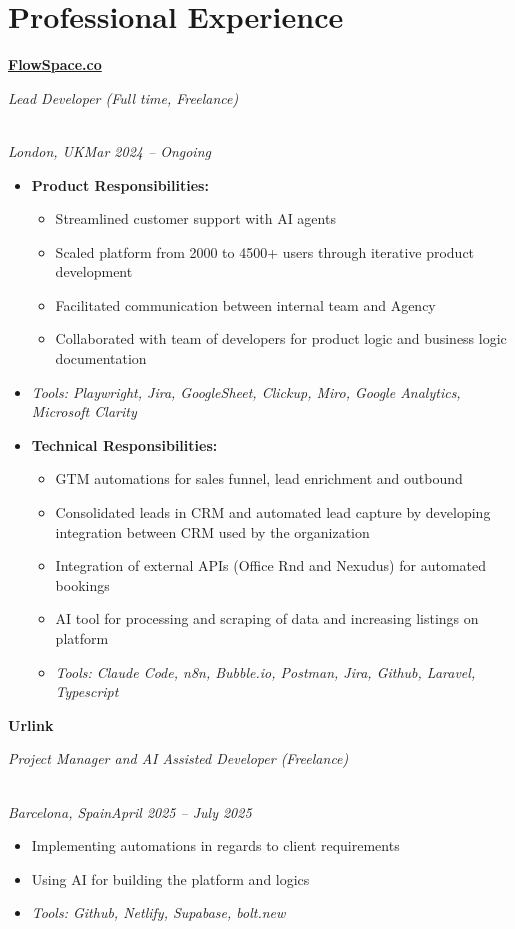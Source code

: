 \documentclass[a4paper,10pt]{article}
\newcommand{\role}[4]{\vspace{3pt}\noindent\hspace{0.6em}\parbox[t]{0.38\textwidth}{\raggedright\textbf{#1}}\hfill\parbox[t]{0.58\textwidth}{\raggedleft\textit{#2}}\\{\textit{#3}\hfill\textit{#4}}\vspace{1pt}}
\begin{document}
\section{Professional Experience}
\role{\href{https://flowspace.co}{FlowSpace.co}}{Lead Developer (Full time, Freelance)}{London, UK}{Mar 2024 -- Ongoing}
\begin{itemize}
\item \textbf{Product Responsibilities:}
\begin{itemize}[label=--]
\item Streamlined customer support with AI agents
\item Scaled platform from 2000 to 4500+ users through iterative product development
\item Facilitated communication between internal team and Agency
\item Collaborated with team of developers for product logic and business logic documentation
\end{itemize}
\item \textit{Tools: Playwright, Jira, GoogleSheet, Clickup, Miro, Google Analytics, Microsoft Clarity}
\item \textbf{Technical Responsibilities:}
\begin{itemize}[label=--]
\item GTM automations for sales funnel, lead enrichment and outbound
\item Consolidated leads in CRM and automated lead capture by developing integration between CRM used by the organization
\item Integration of external APIs (Office Rnd and Nexudus) for automated bookings
\item AI tool for processing and scraping of data and increasing listings on platform
\item \textit{Tools: Claude Code, n8n, Bubble.io, Postman, Jira, Github, Laravel, Typescript}
\end{itemize}
\end{itemize}

\role{Urlink}{Project Manager and AI Assisted Developer (Freelance)}{Barcelona, Spain}{April 2025 -- July 2025}
\begin{itemize}
\item Implementing automations in regards to client requirements
\item Using AI for building the platform and logics
\item \textit{Tools: Github, Netlify, Supabase, bolt.new}
\end{itemize}
\end{document}
